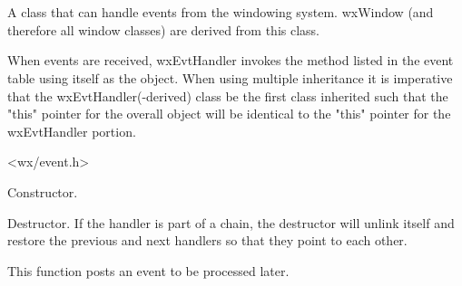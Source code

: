 \section{}\label{wxevthandler}

A class that can handle events from the windowing system.
wxWindow (and therefore all window classes) are derived from
this class.

When events are received, wxEvtHandler invokes the method listed in the
event table using itself as the object.  When using multiple inheritance
it is imperative that the wxEvtHandler(-derived) class be the first
class inherited such that the "this" pointer for the overall object
will be identical to the "this" pointer for the wxEvtHandler portion.




<wx/event.h>






\label{wxevthandlerctor}


Constructor.

\label{wxevthandlerdtor}


Destructor. If the handler is part of a chain, the destructor will
unlink itself and restore the previous and next handlers so that they point to
each other.

\label{wxevthandleraddpendingevent}


This function posts an event to be processed later.




